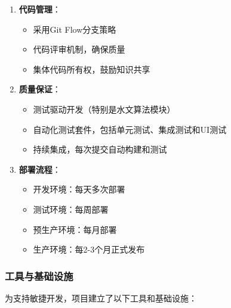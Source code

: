 \begin{enumerate}
\def\labelenumi{\arabic{enumi}.}
\tightlist
\item
  \textbf{代码管理}：

  \begin{itemize}
  \tightlist
  \item
    采用Git Flow分支策略
  \item
    代码评审机制，确保质量
  \item
    集体代码所有权，鼓励知识共享
  \end{itemize}
\item
  \textbf{质量保证}：

  \begin{itemize}
  \tightlist
  \item
    测试驱动开发（特别是水文算法模块）
  \item
    自动化测试套件，包括单元测试、集成测试和UI测试
  \item
    持续集成，每次提交自动构建和测试
  \end{itemize}
\item
  \textbf{部署流程}：

  \begin{itemize}
  \tightlist
  \item
    开发环境：每天多次部署
  \item
    测试环境：每周部署
  \item
    预生产环境：每月部署
  \item
    生产环境：每2-3个月正式发布
  \end{itemize}
\end{enumerate}

\subsubsection{工具与基础设施}\label{ux5de5ux5177ux4e0eux57faux7840ux8bbeux65bd}

为支持敏捷开发，项目建立了以下工具和基础设施：


